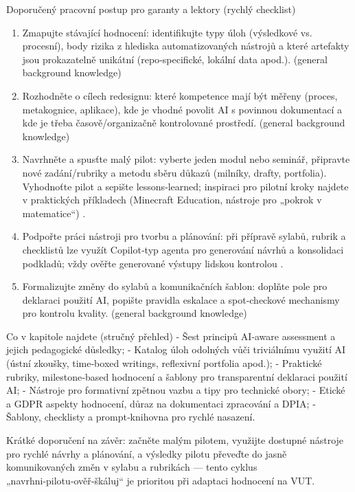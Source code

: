 \documentclass{report}%
\begin{document}
Doporučený pracovní postup pro garanty a lektory (rychlý checklist)
\begin{enumerate}
  \item Zmapujte stávající hodnocení: identifikujte typy úloh (výsledkové vs. procesní), body rizika z hlediska automatizovaných nástrojů a které artefakty jsou prokazatelně unikátní (repo‑specifické, lokální data apod.). (general background knowledge)
  \item Rozhodněte o cílech redesignu: které kompetence mají být měřeny (proces, metakognice, aplikace), kde je vhodné povolit AI s povinnou dokumentací a kde je třeba časově/organizačně kontrolované prostředí. (general background knowledge)
  \item Navrhněte a spusťte malý pilot: vyberte jeden modul nebo seminář, připravte nové zadání/rubriky a metodu sběru důkazů (milníky, drafty, portfolia). Vyhodnoťte pilot a sepište lessons‑learned; inspiraci pro pilotní kroky najdete v praktických příkladech (Minecraft Education, nástroje pro „pokrok v matematice“) \cite{kb_ai_101_tipu_pdf_04e4a115_page_15_2, kb_ai_101_tipu_pdf_04e4a115_page_8_1}.
  \item Podpořte práci nástroji pro tvorbu a plánování: při přípravě sylabů, rubrik a checklistů lze využít Copilot‑typ agenta pro generování návrhů a konsolidaci podkladů; vždy ověřte generované výstupy lidskou kontrolou \cite{kb_ai_101_tipu_pdf_04e4a115_page_48_1}.
  \item Formalizujte změny do sylabů a komunikačních šablon: doplňte pole pro deklaraci použití AI, popište pravidla eskalace a spot‑checkové mechanismy pro kontrolu kvality. (general background knowledge)
\end{enumerate}

Co v kapitole najdete (stručný přehled)
- Šest principů AI‑aware assessment a jejich pedagogické důsledky;  
- Katalog úloh odolných vůči triviálnímu využití AI (ústní zkoušky, time‑boxed writings, reflexivní portfolia apod.);  
- Praktické rubriky, milestone‑based hodnocení a šablony pro transparentní deklaraci použití AI;  
- Nástroje pro formativní zpětnou vazbu a tipy pro technické obory;  
- Etické a GDPR aspekty hodnocení, důraz na dokumentaci zpracování a DPIA;  
- Šablony, checklisty a prompt‑knihovna pro rychlé nasazení.

Krátké doporučení na závěr: začněte malým pilotem, využijte dostupné nástroje pro rychlé návrhy a plánování, a výsledky pilotu převeďte do jasně komunikovaných změn v sylabu a rubrikách — tento cyklus „navrhni‑pilotu‑ověř‑škáluj“ je prioritou při adaptaci hodnocení na VUT. \cite{kb_ai_101_tipu_pdf_04e4a115_page_48_1, kb_ai_101_tipu_pdf_04e4a115_page_15_2, kb_ai_101_tipu_pdf_04e4a115_page_8_1}%
\end{document}
